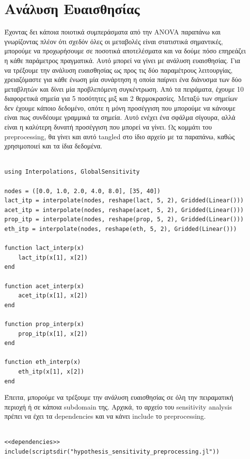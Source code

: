 \documentclass[11pt]{article}
\begin{document}
\section{Ανάλυση Ευαισθησίας}
\label{sec:org4f25bb9}
Έχοντας δει κάποια ποιοτικά συμπεράσματα από την ANOVA παραπάνω και γνωρίζοντας πλέον ότι σχεδόν όλες οι μεταβολές είναι στατιστικά σημαντικές, μπορούμε να προχωρήσουμε σε ποσοτικά αποτελέσματα και να δούμε πόσο επηρεάζει η κάθε παράμετρος πραγματικά. Αυτό μπορεί να γίνει με ανάλυση ευαισθησίας. Για να τρέξουμε την ανάλυση ευαισθησίας ως προς τις δύο παραμέτρους λειτουργίας, χρειαζόμαστε για κάθε ένωση μία συνάρτηση η οποία παίρνει ένα διάνυσμα των δύο μεταβλητών και δίνει μία προβλεπόμενη συγκέντρωση. Από τα πειράματα, έχουμε 10 διαφορετικά σημεία για 5 ποσότητες μιξ και 2 θερμοκρασίες. Μεταξύ των σημείων δεν έχουμε κάποιο δεδομένο, οπότε η μόνη προσέγγιση που μπορούμε να κάνουμε είναι πως συνδέουμε γραμμικά τα σημεία. Αυτό ενέχει ένα σφάλμα σίγουρα, αλλά είναι η καλύτερη δυνατή προσέγγιση που μπορεί να γίνει. Ως κομμάτι του preprocessing, θα γίνει και αυτό tangled στο ίδιο αρχείο με τα παραπάνω, καθώς χρησιμοποιεί και τα ίδια δεδομένα.

\begin{verbatim}

using Interpolations, GlobalSensitivity

nodes = ([0.0, 1.0, 2.0, 4.0, 8.0], [35, 40])
lact_itp = interpolate(nodes, reshape(lact, 5, 2), Gridded(Linear()))
acet_itp = interpolate(nodes, reshape(acet, 5, 2), Gridded(Linear()))
prop_itp = interpolate(nodes, reshape(prop, 5, 2), Gridded(Linear()))
eth_itp = interpolate(nodes, reshape(eth, 5, 2), Gridded(Linear()))

function lact_interp(x)
    lact_itp(x[1], x[2])
end

function acet_interp(x)
    acet_itp(x[1], x[2])
end

function prop_interp(x)
    prop_itp(x[1], x[2])
end

function eth_interp(x)
    eth_itp(x[1], x[2])
end

\end{verbatim}

Έπειτα, μπορούμε να τρέξουμε την ανάλυση ευαισθησίας σε όλη την πειραματική περιοχή ή σε κάποια subdomain της. Αρχικά, το αρχείο του sensitivity analysis πρέπει να έχει τα dependencies και να κάνει include το preprocessing.

\begin{verbatim}

<<dependencies>>
include(scriptsdir("hypothesis_sensitivity_preprocessing.jl"))

\end{verbatim}
\end{document}
